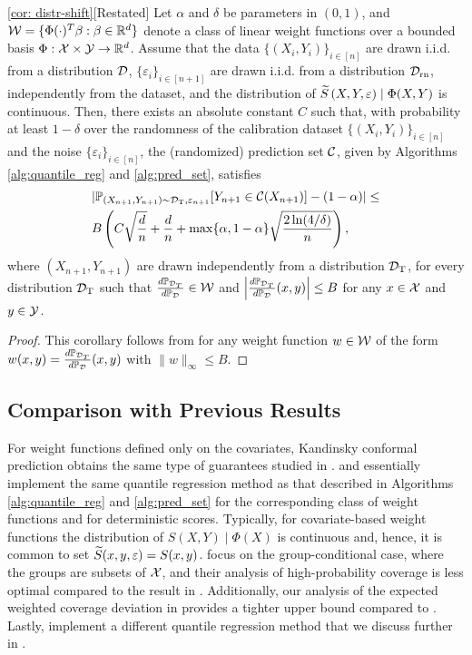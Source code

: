 \begin{customcor}{\ref*{cor: distr-shift}}[Restated]
     Let $\alpha$ and $\delta$ be parameters in $(0,1)$, and ${\cal W} = \{\Phi(\cdot)^T \beta :\beta \in \mathbb{R}^d\}$ denote a class of linear weight functions over a bounded basis $\Phi : {\cal X} \times {\cal Y} \to \mathbb{R}^d$. Assume that the data $\{(X_i,Y_i)\}_{i\in [n]}$ are drawn \mbox{i.i.d.} from a distribution ${\cal D}$, $\{\varepsilon_i\}_{i\in [n+1]}$ are drawn \mbox{i.i.d.} from a distribution ${\cal D}_{\text{rn}}$, independently from the dataset, and the distribution of ${\widetilde{S}}\left(X,Y, \varepsilon\right) \mid \Phi(X,Y)$ is continuous. Then, there exists an absolute constant $C$ such that, with probability at least $1-\delta$ over the randomness of the calibration dataset $\{(X_i,Y_i)\}_{i\in [n]}$ and the noise $\{\varepsilon_i\}_{i \in [n]}$, the (randomized) prediction set ${\cal C}$, given by Algorithms \ref{alg:quantile_reg} and \ref{alg:pred_set}, satisfies
    \begin{align*}
        &|\mathbb{P}_{(X_{n+1},Y_{n+1}) \sim {\cal D}_{\text{T}}, \varepsilon_{n+1}} [Y_{n+1} \in {\cal C}(X_{n+1})] - (1-\alpha)|\leq \\
        &B \left( C \sqrt{\frac{d}{n}} + \frac{d}{n} +\max \{\alpha, 1-\alpha\}\sqrt{\frac{2\ln(4/\delta)}{n}}  \right) ,
    \end{align*}
     where $(X_{n+1},Y_{n+1})$ are drawn independently from a distribution ${\cal D}_{\text{T}}$, for every distribution ${\cal D}_{\text{T}}$ such that $\frac{d\mathbb{P}_{{\cal D}_{T}}}{d\mathbb{P}_{{\cal D}}} \in {\cal W}$ and $ \left|\frac{d\mathbb{P}_{{\cal D}_{T}}}{d\mathbb{P}_{{\cal D}}}(x,y) \right|\leq B$ for any $x \in {\cal X}$ and $y \in {\cal Y}$.  
\end{customcor}
\begin{proof}
 This corollary follows from  for any weight function $w \in {\cal W}$ of the form $w(x,y) = \frac{d\mathbb{P}_{{\cal D}_{T}}}{d\mathbb{P}_{{\cal D}}}(x,y)$ with $\|w\|_{\infty} \leq B$.
\end{proof}
\subsection{Comparison with Previous Results}
\label{sec: comparison}
For weight functions defined only on the covariates, Kandinsky conformal prediction obtains the same type of guarantees studied in \citet{JNRR2023, GCC2023, ACDR24}. \citet{JNRR2023} and \citet{ACDR24} essentially implement the same quantile regression method as that described in Algorithms \ref{alg:quantile_reg} and \ref{alg:pred_set} for the corresponding class of weight functions and for deterministic scores. Typically, for covariate-based weight functions the distribution of $S(X,Y) \mid \Phi(X)$ is continuous and, hence, it is common to set ${\widetilde{S}}(x,y,\varepsilon) = S(x,y)$. \citet{JNRR2023} focus on the group-conditional case, where the groups are subsets of ${\cal X}$, and their analysis of high-probability coverage is less optimal compared to the result in . Additionally, our analysis of the expected weighted coverage deviation in  provides a tighter upper bound compared to \cite{ACDR24}. Lastly, \citet{GCC2023} implement a different quantile regression method that we discuss further in .


